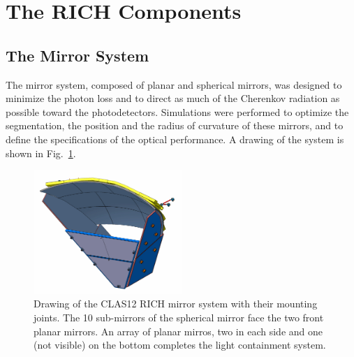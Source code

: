 \documentclass[5p,times,twocolumn]{elsarticle}
\begin{document}

\section{The RICH Components}

\subsection{The Mirror System}

The mirror system, composed of planar and spherical mirrors, was designed to minimize the photon loss and to direct
as much of the Cherenkov radiation as possible toward the photodetectors. Simulations were performed to optimize
the segmentation, the position and the radius of curvature of these mirrors, and to define the specifications of the
optical performance. A drawing of the system is shown in Fig.~\ref{Fig:RICHmirrors}.

\begin{figure}
\begin{center}
\includegraphics[width=0.50\textwidth]{RICHmirrors.pdf}
\caption{Drawing of the CLAS12 RICH mirror system with their mounting joints. The 10 sub-mirrors of the spherical mirror face the
two front planar mirrors. An array of planar mirros, two in each side and one (not visible) on the 
bottom completes the light containment system.}
\label{Fig:RICHmirrors}
\end{center}
\end{figure}
\end{document}
